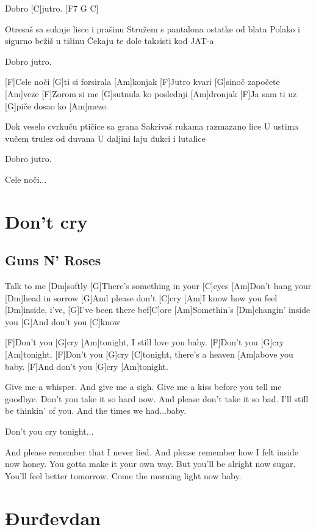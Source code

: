 \documentclass[a4paper,12pt]{article}
\begin{document}
\begin{multicols}{2}
\begin{guitar}
[G]Dobro [C]jutro. [F7 G C]


Otresaš sa suknje lisce i prašinu
Stružem s pantalona ostatke od blata
Polako i sigurno bežiš u tišinu
Čekaju te dole taksisti kod JAT-a


Dobro jutro.


[F]Cele noči [G]ti si forsirala [Am]konjak
[F]Jutro kvari [G]sinoč započete [Am]veze
[F]Zorom si me [G]sutnula ko poslednji [Am]dronjak
[F]Ja sam ti uz [G]piče dosao ko [Am]meze.


Dok veselo cvrkuču ptičice sa grana
Sakrivaš rukama razmazano lice
U ustima vučem trulez od duvana
U daljini laju đukci i lutalice


Dobro jutro.


Cele noči...

\end{guitar}
\section{Don't cry}
\subsection*{Guns N' Roses}
\begin{guitar}
[Am]Talk to me [Dm]softly
[G]There's something in your [C]eyes 
[Am]Don't hang your [Dm]head in sorrow
[G]And please don't [C]cry 
[Am]I know how you feel [Dm]inside, i've, 
[G]I've been there bef[C]ore
[Am]Somethin's [Dm]changin' inside you
[G]And don't you [C]know


[F]Don't you [G]cry [Am]tonight, I still love you baby.
[F]Don't you [G]cry [Am]tonight.                   
[F]Don't you [G]cry [C]tonight,                  
there's a heaven [Am]above you baby. 
[F]And don't you [G]cry [Am]tonight.

Give me a whisper. And give me a sigh. 
Give me a kiss before you tell me goodbye.
Don't you take it so hard now. 
And please don't take it so bad. 
I'll still be thinkin' of you.
And the times we had...baby.

Don't you cry tonight...

And please remember that I never lied. 
And please remember 
how I felt inside now honey. 
You gotta make it your own way. 
But you'll be alright now sugar. 
You'll feel better tomorrow. 
Come the morning light now baby.

\end{guitar}
\section{Đurđevdan}

\end{multicols}
\end{document}

